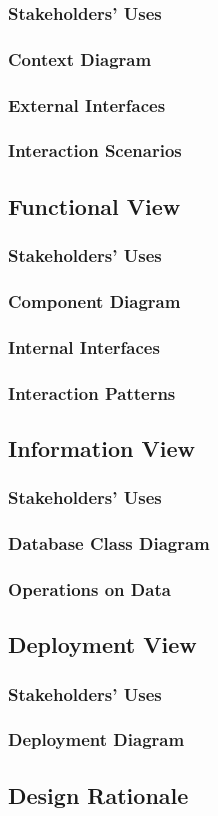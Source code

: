 \documentclass[a4paper]{article}
\begin{document}
    \subsubsection{Stakeholders' Uses}
    \lipsum[1-1]
    \subsubsection{Context Diagram}
    \subsubsection{External Interfaces}
    \lipsum[1-1]
    \subsubsection{Interaction Scenarios}
    \lipsum[1-1]
    \subsection{Functional View}
    \subsubsection{Stakeholders' Uses}
    \lipsum[1-1]
    \subsubsection{Component Diagram}
    \subsubsection{Internal Interfaces}
    \lipsum[1-1]
    \subsubsection{Interaction Patterns}
    \lipsum[1-1]
    \subsection{Information View}
    \subsubsection{Stakeholders' Uses}
    \lipsum[1-1]
    \subsubsection{Database Class Diagram}
    \subsubsection{Operations on Data}
    \lipsum[1-1]
    \subsection{Deployment View}
    \subsubsection{Stakeholders' Uses}
    \lipsum[1-1]
    \subsubsection{Deployment Diagram}
    \subsection{Design Rationale}
    \lipsum[1-1]
    
\end{document}
